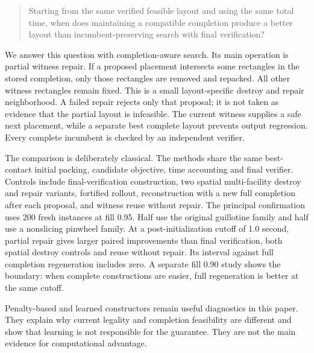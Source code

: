 \documentclass[preprint,12pt,authoryear]{elsarticle}
\begin{document}
\begin{quote}
Starting from the same verified feasible layout and using the same total time,
when does maintaining a compatible completion produce a better layout than
incumbent-preserving search with final verification?
\end{quote}

We answer this question with completion-aware search. Its main operation is
partial witness repair. If a proposed placement intersects some rectangles in
the stored completion, only those rectangles are removed and repacked. All other
witness rectangles remain fixed. This is a small layout-specific destroy and
repair neighborhood. A failed repair rejects only that proposal; it is not taken
as evidence that the partial layout is infeasible. The current witness supplies
a safe next placement, while a separate best complete layout prevents output
regression. Every complete incumbent is checked by an independent verifier.

The comparison is deliberately classical. The methods share the same
best-contact initial packing, candidate objective, time accounting and final
  verifier. Controls include final-verification construction, two spatial
  multi-facility destroy and repair variants, fortified rollout, reconstruction
  with a new full completion after each proposal, and witness reuse without
  repair. The principal confirmation
uses 200 fresh instances at fill 0.95. Half use the original guillotine family
and half use a nonslicing pinwheel family. At a post-initialization cutoff of
1.0 second, partial repair gives larger paired improvements than final
verification, both spatial destroy controls and reuse without repair. Its
interval against full completion regeneration includes zero. A separate fill
0.90 study shows the boundary: when complete constructions are easier, full
regeneration is better at the same cutoff.

Penalty-based and learned constructors remain useful diagnostics in this paper.
They explain why current legality and completion feasibility are different and
show that learning is not responsible for the guarantee. They are not the main
evidence for computational advantage.
\end{document}
